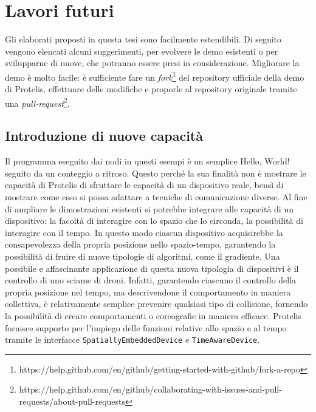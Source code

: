 \section{Lavori futuri}
Gli elaborati proposti in questa tesi sono facilmente estendibili. Di seguito
vengono elencati alcuni suggerimenti, per evolvere le demo esistenti o per
svilupparne di nuove, che potranno essere presi in considerazione.  Migliorare
la demo è molto facile: è sufficiente fare un
\textit{fork}\footnote{https://help.github.com/en/github/getting-started-with-github/fork-a-repo}
del repository ufficiale della demo di Protelis, effettuare delle modifiche e
proporle al repository originale tramite una
\textit{pull-request}\footnote{https://help.github.com/en/github/collaborating-with-issues-and-pull-requests/about-pull-requests}.

\subsection{Introduzione di nuove capacità}
Il programma eseguito dai nodi in questi esempi è un semplice Hello, World!
seguito da un conteggio a ritroso. Questo perché la sua finalità non è mostrare
le capacità di Protelis di sfruttare le capacità di un dispositivo reale, bensì
di mostrare come esso si possa adattare a tecniche di comunicazione diverse.  Al
fine di ampliare le dimostrazioni esistenti si potrebbe integrare alle capacità
di un dispositivo: la facoltà di interagire con lo spazio che lo circonda, la
possibilità di interagire con il tempo. In questo modo ciascun dispositivo
acquisirebbe la consapevolezza della propria posizione nello spazio-tempo,
garantendo la possibilità di fruire di nuove tipologie di algoritmi, come il
gradiente. Una possibile e affascinante applicazione di questa nuova tipologia
di dispositivi è il controllo di uno sciame di droni. Infatti, garantendo
ciascuno il controllo della propria posizione nel tempo, ma descrivendone il
comportamento in maniera collettiva, è relativamente semplice prevenire
qualsiasi tipo di collisione, fornendo la possibilità di creare comportamenti o
coreografie in maniera efficace.  Protelis fornisce supporto per l'impiego delle
funzioni relative allo spazio e al tempo tramite le interfacce
\texttt{SpatiallyEmbeddedDevice} e \texttt{TimeAwareDevice}.

